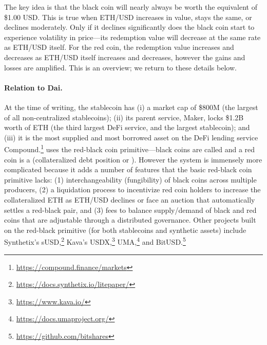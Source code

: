The key idea is that the black coin will nearly always be worth the equivalent of \$1.00 USD. This is true when ETH/USD increases in value, stays the same, or declines moderately. Only if it declines significantly does the black coin start to experience volatility in price---its redemption value will decrease at the same rate as ETH/USD itself. For the red coin, the redemption value increases and decreases as ETH/USD itself increases and decreases, however the gains and losses are amplified. This is an overview; we return to these details below.

\paragraph{Relation to Dai.} At the time of writing, the stablecoin \dai has (i) a market cap of \$800M (the largest of all non-centralized stablecoins); (ii) its parent service, Maker, locks \$1.2B worth of ETH (the third largest DeFi service, and the largest stablecoin); and (iii) it is the most supplied and most borrowed asset on the DeFi lending service Compound.\footnote{\url{https://compound.finance/markets}} \dai uses the red-black coin primitive---black coins are called \dai and a red coin is a \vault (\nee collateralized debt position or \cdp). However the system is immensely more complicated because it adds a number of features that the basic red-black coin primitive lacks: (1) interchangeability (fungibility) of black coins across multiple producers, (2) a liquidation process to incentivize red coin holders to increase the collateralized ETH as ETH/USD declines or face an auction that automatically settles a red-black pair, and (3) fees to balance supply/demand of black and red coins that are adjustable through a distributed governance. Other projects built on the red-black primitive (for both stablecoins and synthetic assets) include Synthetix's sUSD,\footnote{\url{https://docs.synthetix.io/litepaper/}} Kava's USDX,\footnote{\url{https://www.kava.io/}} UMA,\footnote{\url{https://docs.umaproject.org/}} and BitUSD.\footnote{\url{https://github.com/bitshares}}


